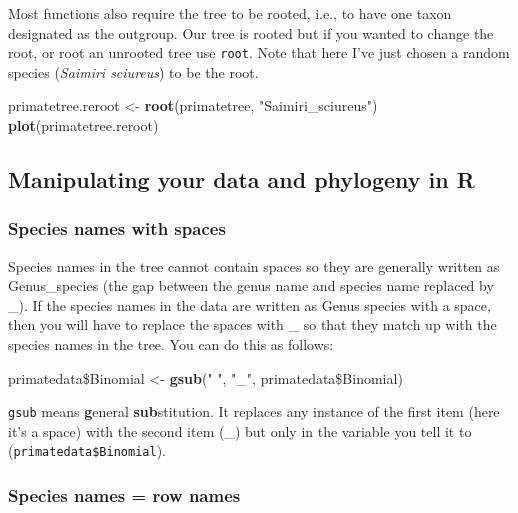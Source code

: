\documentclass[12pt]{article}
\newcommand{\KeywordTok}[1]{\textcolor[rgb]{0.13,0.29,0.53}{\textbf{{#1}}}}
\newcommand{\StringTok}[1]{\textcolor[rgb]{0.31,0.60,0.02}{{#1}}}
\newcommand{\NormalTok}[1]{{#1}}
\begin{document}
Most functions also require the tree to be rooted, i.e., to have one taxon designated as the outgroup. Our tree is rooted but if you wanted to change the root, or root an unrooted tree use \texttt{root}. Note that here I've just chosen a random species (\textit{Saimiri sciureus}) to be the root.

\begin{snugshade}
\begin{Highlighting}[]
\NormalTok{primatetree.reroot <-}\StringTok{ }\KeywordTok{root}\NormalTok{(primatetree, }\StringTok{"Saimiri_sciureus"}\NormalTok{)  }
\KeywordTok{plot}\NormalTok{(primatetree.reroot)}
\end{Highlighting}
\end{snugshade}

\subsection{Manipulating your data and phylogeny in R}

\subsubsection{Species names with spaces} 
Species names in the tree cannot contain spaces so they are generally written as Genus\_species (the gap between the genus name and species name replaced by \_). If the species names in the data are written as Genus species with a space, then you will have to replace the spaces with \_ so that they match up with the species names in the tree. You can do this as follows:

\begin{snugshade}
\begin{Highlighting}[]
\NormalTok{primatedata\$Binomial <-}\StringTok{ }\KeywordTok{gsub}\NormalTok{(}\StringTok{" "}\NormalTok{, }\StringTok{"_"}\NormalTok{, primatedata\$Binomial)}
\end{Highlighting}
\end{snugshade}

\texttt{gsub} means \textbf{g}eneral \textbf{sub}stitution. It replaces any instance of the first item (here it’s a space) with the second item (\_) but only in the variable you tell it to (\texttt{primatedata\$Binomial}).

\subsubsection{Species names = row names}
\end{document}
